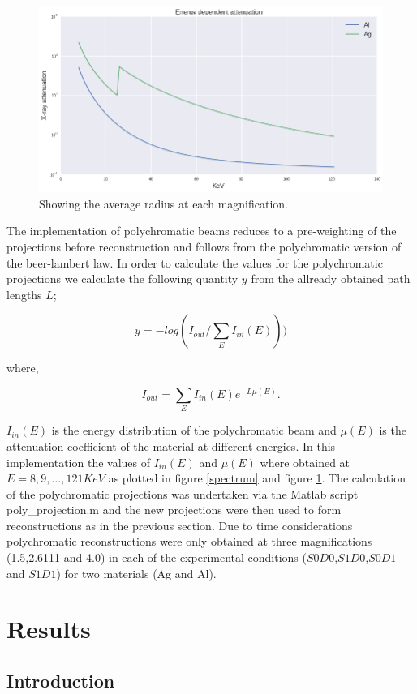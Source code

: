\documentclass[
  twoside,
  11pt, a4paper,
  footinclude=true,
  headinclude=true,
  cleardoublepage=empty
]{scrbook}
\begin{document}
\begin{figure}[h!]
  \centering
    \includegraphics[width=\textwidth]{figures/mu.png}
    \caption{Showing the average radius at each magnification.}
    \label{mu}
\end{figure}


The implementation of polychromatic beams reduces to a pre-weighting of the projections before reconstruction and follows from the polychromatic version of the beer-lambert law. In order to calculate the values for the polychromatic projections we calculate the following quantity $y$ from the allready obtained path lengths $L$;

\[
y = -log(I_{out}/\sum_E I_{in}(E)))
\]

where,

\[
I_{out} = \sum_E I_{in}(E) e^{-L \mu(E)}.
\]

$I_{in}(E)$ is the energy distribution of the polychromatic beam and $\mu(E)$ is the attenuation coefficient of the material at different energies. In this implementation the values of $I_{in}(E)$ and $\mu(E)$ where obtained at $E = 8,9,\ldots,121 KeV$ as plotted in figure \ref{spectrum} and figure \ref{mu}. The calculation of the polychromatic projections was undertaken via the Matlab script poly\_projection.m and the new projections were then used to form reconstructions as in the previous section. Due to time considerations polychromatic reconstructions were only obtained at three magnifications (1.5,2.6111 and 4.0) in each of the experimental conditions ($S0D0$,$S1D0$,$S0D1$ and $S1D1$) for two materials (Ag and Al).

\chapter{Results}

\section{Introduction}
\end{document}
